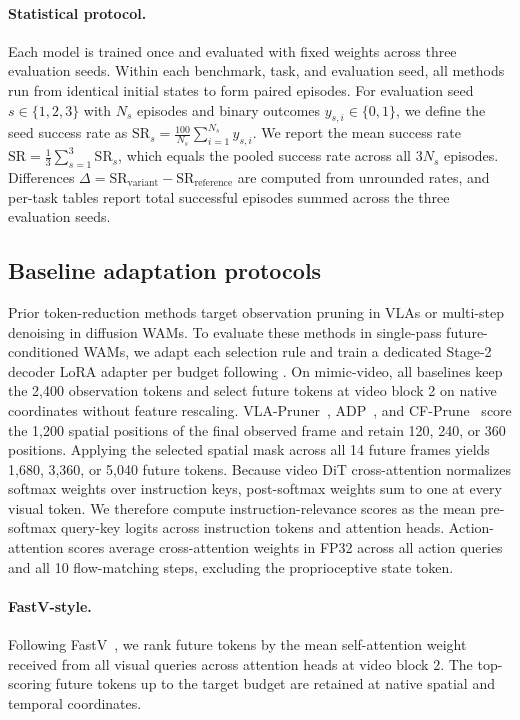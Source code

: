 \paragraph{Statistical protocol.}
    Each model is trained once and evaluated with fixed weights across three evaluation seeds.
    Within each benchmark, task, and evaluation seed, all methods run from identical initial states to form paired episodes.
    For evaluation seed $s \in \{1, 2, 3\}$ with $N_s$ episodes and binary outcomes $y_{s,i} \in \{0, 1\}$, we define the seed success rate as $\mathrm{SR}_s = \frac{100}{N_s}\sum_{i=1}^{N_s} y_{s,i}$.
    We report the mean success rate $\mathrm{SR} = \frac{1}{3}\sum_{s=1}^{3} \mathrm{SR}_s$, which equals the pooled success rate across all $3N_s$ episodes.
    Differences $\Delta = \mathrm{SR}_{\mathrm{variant}} - \mathrm{SR}_{\mathrm{reference}}$ are computed from unrounded rates, and per-task tables report total successful episodes summed across the three evaluation seeds.

\subsection{Baseline adaptation protocols}
\label{app:supp_baselines}
    Prior token-reduction methods target observation pruning in VLAs or multi-step denoising in diffusion WAMs.
    To evaluate these methods in single-pass future-conditioned WAMs, we adapt each selection rule and train a dedicated Stage-2 decoder LoRA adapter per budget following .
    On mimic-video, all baselines keep the 2,400 observation tokens and select future tokens at video block 2 on native coordinates without feature rescaling.
    VLA-Pruner~\cite{liu2025vlapruner}, ADP~\cite{pei2026adp}, and CF-Prune~\cite{kim2026cfprune} score the 1,200 spatial positions of the final observed frame and retain 120, 240, or 360 positions.
    Applying the selected spatial mask across all 14 future frames yields 1,680, 3,360, or 5,040 future tokens.
    Because video DiT cross-attention normalizes softmax weights over instruction keys, post-softmax weights sum to one at every visual token.
    We therefore compute instruction-relevance scores as the mean pre-softmax query-key logits across instruction tokens and attention heads.
    Action-attention scores average cross-attention weights in FP32 across all action queries and all 10 flow-matching steps, excluding the proprioceptive state token.

\paragraph{FastV-style.}
    Following FastV~\cite{chen2024fastv}, we rank future tokens by the mean self-attention weight received from all visual queries across attention heads at video block 2.
    The top-scoring future tokens up to the target budget are retained at native spatial and temporal coordinates.

